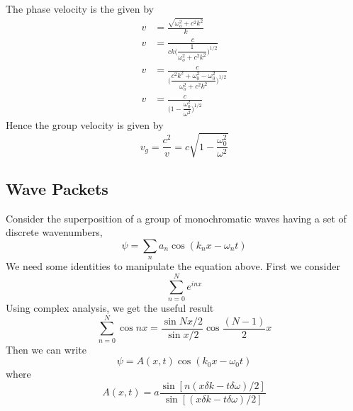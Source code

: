 \documentclass[../../../main.tex]{subfiles}
\begin{document}
The phase velocity is the given by 
\begin{align*}
    v&=\frac{\sqrt{\omega_o^2+c^2k^2}}{k}\\
    v&=\frac{c}{ck\biggl(\dfrac{1}{\omega_o^2+c^2k^2}\biggr)^{1/2}}\\
    v&=\frac{c}{\biggl(\dfrac{c^2k^2+\omega_0^2-\omega_0^2}{\omega_o^2+c^2k^2}\biggr)^{1/2}}\\
    v&=\frac{c}{\biggl(1-\dfrac{\omega_0^2}{\omega^2}\biggr)^{1/2}}
\end{align*}
Hence the group velocity is given by 
\begin{equation*}
    v_g=\frac{c^2}{v}=c\sqrt{1-\dfrac{\omega_0^2}{\omega^2}}
\end{equation*}

\subsection{Wave Packets}
Consider the superposition of a group of monochromatic waves having a set of discrete wavenumbers,
\begin{equation*}
    \psi=\sum_{n}a_n \cos(k_n x - \omega_n t)
\end{equation*}
We need some identities to manipulate the equation above. First we consider
\begin{equation*}
    \sum_{n=0}^{N}e^{inx}
\end{equation*} 
Using complex analysis, we get the useful result
\begin{equation*}
    \sum_{n=0}^{N}\cos nx=\frac{\sin Nx/2}{\sin x/2}\cos\frac{(N-1)}{2}x
\end{equation*}
Then we can write 
\begin{equation*}
    \psi=A(x, t)\cos(k_0 x - \omega_0 t)
\end{equation*}
where 
\begin{equation*}
    A(x, t) = a\frac{\sin[n(x\delta k  -t\delta\omega)/2]}{\sin[(x\delta k  -t\delta\omega)/2]}
\end{equation*}
\end{document}
